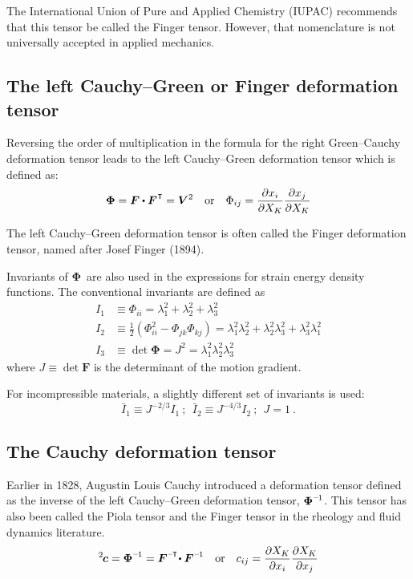 \begin{otherlanguage}{russian}
{The International Union of Pure and Applied Chemistry (IUPAC) recommends that this tensor be called the Finger tensor. However, that nomenclature is not universally accepted in applied mechanics.

\subsection*{The left Cauchy\hbox{--}Green or Finger deformation tensor}

Reversing the order of multiplication in the formula for the right Green–Cauchy deformation tensor leads to the left Cauchy\hbox{--}Green deformation tensor which is defined as:
\[ \displaystyle \bm{\Phi} = \bm{F} \dotp \bm{F}^{\hspace{.1ex}\T} = \bm{V}^{2}
\quad {\text{or}} \quad
\Phi_{ij}={\frac{\partial x_{i}}{\partial X_{K}}}{\frac{\partial x_{j}}{\partial X_{K}}} \]

The left Cauchy\hbox{--}Green deformation tensor is often called the Finger deformation tensor, named after Josef Finger (1894).

Invariants of ${\bm{\Phi}}\,\!$ are also used in the expressions for strain energy density functions. The conventional invariants are defined as
\[ \displaystyle {\begin{aligned}I_{1} & \equiv \Phi_{ii} = \lambda_{1}^{2}+\lambda_{2}^{2}+\lambda_{3}^{2}\\
I_{2} & \equiv {\tfrac {1}{2}} \left( \Phi_{ii}^{2} - \Phi_{jk}\Phi_{kj} \right) = \lambda_{1}^{2}\lambda_{2}^{2} + \lambda_{2}^{2}\lambda_{3}^{2}+\lambda_{3}^{2}\lambda_{1}^{2}\\
I_{3} & \equiv \det \bm{\Phi} = J^{2} = \lambda_{1}^{2}\lambda_{2}^{2}\lambda_{3}^{2}\end{aligned}} \]
where $J \equiv \det{\bm{F}}$ is the determinant of the motion gradient.

For incompressible materials, a slightly different set of invariants is used:
\[ \displaystyle {\bar {I}}_{1} \equiv J^{-2/3}I_{1}~;~~{\bar {I}}_{2} \equiv J^{-4/3}I_{2}~;~~J=1~. \]

\subsection*{The Cauchy deformation tensor}

Earlier in 1828, Augustin Louis Cauchy introduced a deformation tensor defined as the inverse of the left Cauchy\hbox{--}Green deformation tensor, $\bm{\Phi}^{\expminusone}\,\!$. This tensor has also been called the Piola tensor and the Finger tensor in the rheology and fluid dynamics literature.
\[ \displaystyle ^2\hspace{-0.2ex}\bm{c} = \bm{\Phi}^{\expminusone} = \bm{F}^{\expminusT} \!\dotp \bm{F}^{\expminusone}
\quad {\text{or}} \quad
c_{ij} = {\frac{\partial X_{K}}{\partial x_{i}}}{\frac{\partial X_{K}}{\partial x_{j}}} \]

}
\end{otherlanguage}
